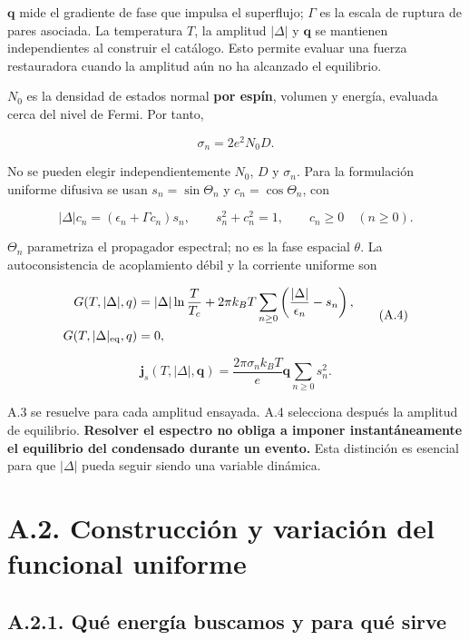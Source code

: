 \documentclass[
  spanish,
  10pt,
  a4paper,
]{article}
\begin{document}
\(\mathbf q\) mide el gradiente de fase que impulsa el superflujo;
\(\Gamma\) es la escala de ruptura de pares asociada. La temperatura
\(T\), la amplitud \(|\Delta|\) y \(\mathbf q\) se mantienen
independientes al construir el catálogo. Esto permite evaluar una fuerza
restauradora cuando la amplitud aún no ha alcanzado el equilibrio.

\(N_0\) es la densidad de estados normal \textbf{por espín}, volumen y
energía, evaluada cerca del nivel de Fermi. Por tanto,

\[
\sigma_n=2e^2N_0D.
\tag{A.2}
\]

No se pueden elegir independientemente \(N_0\), \(D\) y \(\sigma_n\).
Para la formulación uniforme difusiva se usan \(s_n=\sin\Theta_n\) y
\(c_n=\cos\Theta_n\), con

\[
|\Delta|c_n=(\epsilon_n+\Gamma c_n)s_n,
\qquad s_n^2+c_n^2=1,\qquad c_n\geq0\quad(n\geq0).
\tag{A.3}
\]

\(\Theta_n\) parametriza el propagador espectral; no es la fase espacial
\(\theta\). La autoconsistencia de acoplamiento débil y la corriente
uniforme son

\[
\begin{aligned}
G(T,|\Delta|,q)&=|\Delta|\ln\frac{T}{T_c}
+2\pi k_BT\sum_{n\geq0}\left(\frac{|\Delta|}{\epsilon_n}-s_n\right),\\
G(T,|\Delta|_{\rm eq},q)&=0,
\end{aligned}
\tag{A.4}
\]

\[
\mathbf j_s(T,|\Delta|,\mathbf q)
=\frac{2\pi\sigma_n k_BT}{e}\mathbf q\sum_{n\geq0}s_n^2.
\tag{A.5}
\]

A.3 se resuelve para cada amplitud ensayada. A.4 selecciona después la
amplitud de equilibrio. \textbf{Resolver el espectro no obliga a imponer
instantáneamente el equilibrio del condensado durante un evento.} Esta
distinción es esencial para que \(|\Delta|\) pueda seguir siendo una
variable dinámica.

\newpage

\section{A.2. Construcción y variación del funcional
uniforme}\label{a.2.-construcciuxf3n-y-variaciuxf3n-del-funcional-uniforme}

\subsection{A.2.1. Qué energía buscamos y para qué
sirve}\label{a.2.1.-quuxe9-energuxeda-buscamos-y-para-quuxe9-sirve}
\end{document}
